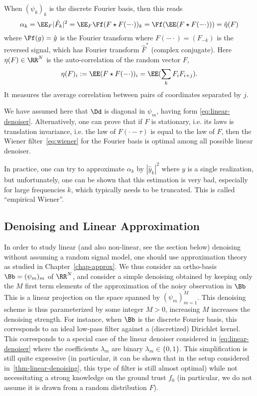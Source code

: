 When $(\psi_k)_k$ is the discrete Fourier basis, then this reads
$$
	\alpha_k = \EE_F |\hat F_k|^2 = \EE_F \Ff( F \star F(-\cdot) )_k = \Ff( \EE( F \star F(-\cdot) ) ) = \hat \eta( F )
$$
where $\Ff(g)=\hat g$ is the Fourier transform where $F(-\cdot) = ( F_{-k} )$ is the reversed signal, which has Fourier transform $\hat F^*$ (complex conjugate). 
%
Here $\eta(F) \in \RR^N$ is the auto-correlation of the random vector $F$, 
$$
	\eta(F)_i := \EE( F \star F(-\cdot) )_i = \EE( \sum_k F_i F_{i+j} ).
$$
It measures the average correlation between pairs of coordinates separated by $j$. 

We have assumed here that $\Dd$ is diagonal in $\psi_m$, having form \eqref{eq:linear-denoiser}. Alternatively, one can prove that if $F$ is stationary, i.e. its laws is translation invariance, i.e. the law of $F(\cdot-\tau)$ is equal to the law of $F$, then the Wiener filter~\eqref{eq:wiener} for the Fourier basis is optimal among all possible linear denoiser. 

In practice, one can try to approximate $\alpha_k$ by $|\hat y_k|^2$ where $y$ is a single realization, but unfortunately, one can be shown that this estimation is very bad, especially for large frequencies $k$, which typically needs to be truncated. This is called ``empirical Wiener''. 


\subsection{Denoising and Linear Approximation}

In order to study linear (and also non-linear, see the section below) denoising without assuming a random signal model, one should use approximation theory as studied in Chapter~\ref{chap-approx}. 
%
We thus consider an ortho-basis $\Bb = (\psi_m)_m$ of $\RR^N$, and consider a simple denoising obtained by keeping only the $M$ first term elements of the approximation of the noisy observation in $\Bb$
This is a linear projection on the space spanned by $(\psi_m)_{m=1}^M$.
%
This denoising scheme is thus parameterized by some integer $M>0$, increasing $M$ increases the denoising strength. 
%
For instance, when $\Bb$ is the discrete Fourier basis, this corresponds to an ideal low-pass filter against a (discretized) Dirichlet kernel.
%
This corresponds to a special case of the linear denoiser considered in \eqref{eq:linear-denoiser} where the coefficients $\lambda_m$ are binary $\lambda_m \in \{0,1\}$. This simplification is still quite expressive (in particular, it can be shown that in the setup considered in~\eqref{thm-linear-denoising}, this type of filter is still almost optimal) while not necessitating a strong knowledge on the ground trust $f_0$ (in particular, we do not assume it is drawn from a random distribution $F$). 

